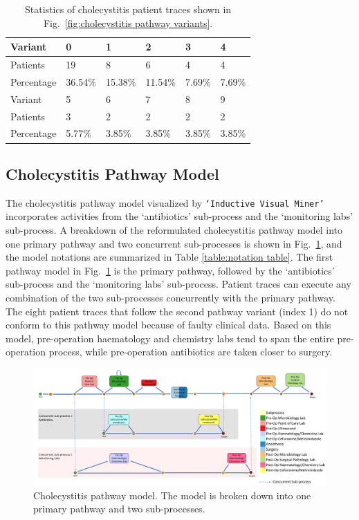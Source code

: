 \begin{table}[t]
\centering
\caption{Statistics of cholecystitis patient traces shown in Fig.~\ref{fig:cholecystitis pathway variants}.}
\label{table:cholecystitis variant table}
\begin{tabular}{llllll}
  \hline
  \hline
Variant &     0  &     1  &     2  &     3  &    4\\
\hline
Patients   &    19 &     8 &     6 &     4 &    4\\
  Percentage &  36.54\% &  15.38\% &  11.54\% &  7.69\% &  7.69\%\\
  \hline
  \hline
Variant &     5  &    6  &    7  &    8 &    9\\
\hline
Patients   &   3 &     2 &     2 &     2 &     2 \\
Percentage &  5.77\% &  3.85\% &  3.85\% &  3.85\% &  3.85\% \\
  \hline
  \hline
\end{tabular}
\end{table}

\subsection{Cholecystitis Pathway Model}
The cholecystitis pathway model visualized by \texttt{`Inductive Visual Miner'} incorporates activities from the `antibiotics' sub-process and the `monitoring labs' sub-process. A breakdown of the reformulated cholecystitis pathway model into one primary pathway and two concurrent sub-processes is shown in Fig.~\ref{fig:cholecystitis pathway model}, and the model notations are summarized in Table \ref{table:notation table}. The first pathway model in Fig.~\ref{fig:cholecystitis pathway model} is the primary pathway, followed by the `antibiotics’ sub-process and the `monitoring labs’ sub-process. Patient traces can execute any combination of the two sub-processes concurrently with the primary pathway. The eight patient traces that follow the second pathway variant (index 1) do not conform to this pathway model because of faulty clinical data. Based on this model, pre-operation haematology and chemistry labs tend to span the entire pre-operation process, while pre-operation antibiotics are taken closer to surgery.

\begin{figure}[t]
\centering
\includegraphics[width=18cm,angle=270]{images/communicative_cholecystitis_process_models_anes.jpg}
\caption{Cholecystitis pathway model. The model is broken down into one primary pathway and two sub-processes.}
\label{fig:cholecystitis pathway model}
\end{figure}